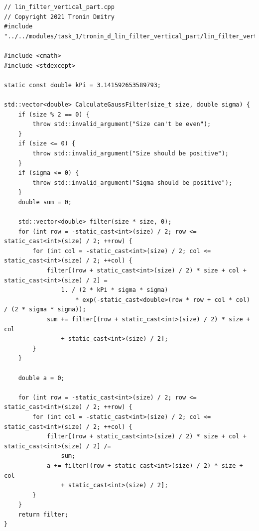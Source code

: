 \documentclass{report}
\begin{document}
\begin{lstlisting}[breaklines=true]
// lin_filter_vertical_part.cpp
// Copyright 2021 Tronin Dmitry
#include "../../modules/task_1/tronin_d_lin_filter_vertical_part/lin_filter_vertical_part.h"

#include <cmath>
#include <stdexcept>

static const double kPi = 3.141592653589793;

std::vector<double> CalculateGaussFilter(size_t size, double sigma) {
    if (size % 2 == 0) {
        throw std::invalid_argument("Size can't be even");
    }
    if (size <= 0) {
        throw std::invalid_argument("Size should be positive");
    }
    if (sigma <= 0) {
        throw std::invalid_argument("Sigma should be positive");
    }
    double sum = 0;

    std::vector<double> filter(size * size, 0);
    for (int row = -static_cast<int>(size) / 2; row <= static_cast<int>(size) / 2; ++row) {
        for (int col = -static_cast<int>(size) / 2; col <= static_cast<int>(size) / 2; ++col) {
            filter[(row + static_cast<int>(size) / 2) * size + col + static_cast<int>(size) / 2] =
                1. / (2 * kPi * sigma * sigma)
                    * exp(-static_cast<double>(row * row + col * col) / (2 * sigma * sigma));
            sum += filter[(row + static_cast<int>(size) / 2) * size + col
                + static_cast<int>(size) / 2];
        }
    }

    double a = 0;

    for (int row = -static_cast<int>(size) / 2; row <= static_cast<int>(size) / 2; ++row) {
        for (int col = -static_cast<int>(size) / 2; col <= static_cast<int>(size) / 2; ++col) {
            filter[(row + static_cast<int>(size) / 2) * size + col + static_cast<int>(size) / 2] /=
                sum;
            a += filter[(row + static_cast<int>(size) / 2) * size + col
                + static_cast<int>(size) / 2];
        }
    }
    return filter;
}


\end{lstlisting}
\end{document}
